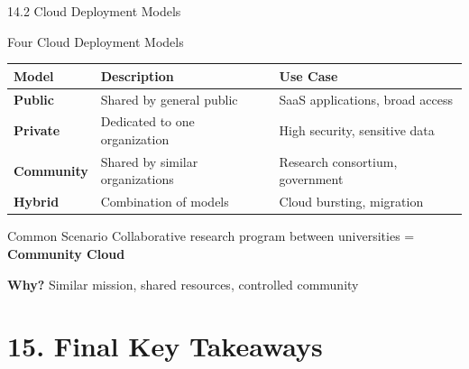 \documentclass{beamer}
\begin{document}
	\begin{frame}{14.2 Cloud Deployment Models}
		\begin{block}{Four Cloud Deployment Models}
			\begin{tabular}{|p{2.5cm}|p{4cm}|p{4.5cm}|}
				\hline
				\textbf{Model} & \textbf{Description} & \textbf{Use Case} \\
				\hline
				\textbf{Public} & Shared by general public & SaaS applications, broad access \\
				\hline
				\textbf{Private} & Dedicated to one organization & High security, sensitive data \\
				\hline
				\textbf{Community} & Shared by similar organizations & Research consortium, government \\
				\hline
				\textbf{Hybrid} & Combination of models & Cloud bursting, migration \\
				\hline
			\end{tabular}
		\end{block}
		
		\begin{exampleblock}{Common Scenario}
			Collaborative research program between universities = \textbf{Community Cloud}
			
			\textbf{Why?} Similar mission, shared resources, controlled community
		\end{exampleblock}
	\end{frame}
	
	\section{15. Final Key Takeaways}
	
\end{document}
